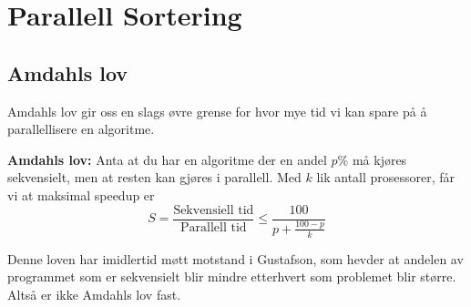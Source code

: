 \section{Parallell Sortering} \vspace{-20pt}
\subsection{Amdahls lov}
\label{sec:amdahl}

Amdahls lov gir oss en slags øvre grense for hvor mye tid vi kan spare på å
parallellisere en algoritme.
\begin{theorem}\textbf{Amdahls lov: } 
  Anta at du har en algoritme der en andel
  $p\%$ må kjøres sekvensielt, men at resten kan gjøres i parallell.
  Med $k$ lik antall prosessorer, får vi at maksimal speedup er
  \[
    S = \frac{\text{Sekvensiell tid}}{\text{Parallell tid}} \leq \frac{100}{p + \frac{100 - p}{k}}
  \]
\end{theorem}

Denne loven har imidlertid møtt motstand i Gustafson, som hevder at andelen av
programmet som er sekvensielt blir mindre etterhvert som problemet blir større.
Altså er ikke Amdahls lov fast.

